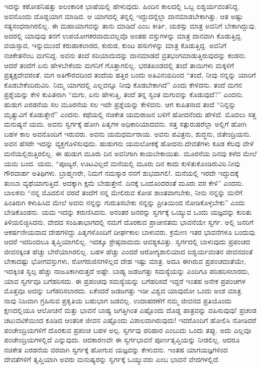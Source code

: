 ಇದನ್ನು ಕಠೋಪನಿಷತ್ತು ಅಲಂಕಾರಿಕ ಭಾಷೆಯಲ್ಲಿ ಹೇಳುವುದು. ಹಿಂದಿನ ಕಾಲದಲ್ಲಿ ಒಬ್ಬ ಐಶ್ವರ್ಯವಂತನಿದ್ದ. ಅವನೊಂದು ದೊಡ್ಡಯಾಗ ಮಾಡಿದ. ಆ ಯಾಗದಲ್ಲಿ ತನ್ನಲ್ಲಿ ಇದ್ದುದನ್ನೆಲ್ಲಾ ದಾನಮಾಡಬೇಕಾಗಿತ್ತು. ಆತ ಅಷ್ಟು ಸತ್ಯಸಂಧನಾಗಿರಲಿಲ್ಲ. ಈ ಮಹಾಯಾಗವನ್ನು ತಾನು ಮಾಡಿದೆ ಎಂಬ ಕೀರ್ತಿ, ಯಶಸ್ಸು ಮಾತ್ರ ಅವನಿಗೆ ಬೇಕಾಗಿದ್ದುವು. ಅದರಲ್ಲಿ ಯಾವುವು ತನಗೆ ಉಪಯೋಗಕರವಾದುವಲ್ಲವೊ ಅಂತಹ ವಸ್ತುಗಳನ್ನು ಮಾತ್ರ ದಾನವಾಗಿ ಕೊಡುತ್ತಿದ್ದ. ವಯಸ್ಸಾದ, ಇನ್ನುಮುಂದೆ ಕರುಹಾಕಲಾರದ, ಕುರುಡ, ಕುಂಟ ಹಸುಗಳನ್ನು ಮಾತ್ರ ಕೊಡುತ್ತಿದ್ದ. ಅವನಿಗೆ ನಚಿಕೇತನೆಂಬ ಮಗನಿದ್ದ. ಅವನು ತಂದೆ ಸರಿಯಾದುದನ್ನು ದಾನಮಾಡದೆ ವ್ರತಭಂಗಮಾಡುತ್ತಿರುವುದನ್ನು ಕಂಡನು. ಆದರೆ ತಂದೆಗೆ ಏನು ಹೇಳಬೇಕೆಂದು ಮಗನಿಗೆ ಗೊತ್ತಾಗಲಿಲ್ಲ. ಭರತಖಂಡದಲ್ಲಿ ತಂದೆ ತಾಯಿಗಳು ಮಕ್ಕಳಿಗೆ ಪ್ರತ್ಯಕ್ಷದೇವರಂತೆ. ಮಗ ಅತಿಗೌರವದಿಂದ ತಂದೆಯ ಹತ್ತಿರ ಬಂದು ಅತಿವಿನಯದಿಂದ “ತಂದೆ, ನೀವು ನನ್ನನ್ನು ಯಾರಿಗೆ ಕೊಡಬೇಕೆಂದಿರುವಿರಿ. ನಿಮ್ಮ ಯಾಗದಲ್ಲಿ ಎಲ್ಲವನ್ನೂ ನೀವು ಕೊಡಬೇಕಾಗಿದೆ” ಎಂದು ಕೇಳಿದನು. ತಂದೆ ಮಗನ ಪ್ರಶ್ನೆಯನ್ನು ಕೇಳಿ ಕುಪಿತನಾಗಿ “ಮಗು, ಏನು ಹೇಳುತ್ತಿ, ತಂದೆ ತನ್ನ ಸ್ವಂತ ಮಗುವನ್ನು ಕೊಡುವುದೆ?” ಎಂದನು. ಹುಡುಗ ಎರಡನೆಯ ಸಲ ಮೂರನೆಯ ಸಲ ಇದೇ ಪ್ರಶ್ನೆಯನ್ನು ಕೇಳಿದನು. ಆಗ ಕುಪಿತನಾದ ತಂದೆ “ನಿನ್ನನ್ನು ಮೃತ್ಯುವಿಗೆ ಕೊಡುತ್ತೇನೆ” ಎಂದನು. ಕಥೆಯಲ್ಲಿ ನಚಿಕೇತ ಯಮರಾಜನ ಬಳಿಗೆ ಹೋದನೆಂದು ಹೇಳಿದೆ. ಮೊದಲು ಸತ್ತ ಮನುಷ್ಯನೆ ಯಮ. ಅವನು ಸ್ವರ್ಗಕ್ಕೆ ಹೋಗಿ ಪಿತೃಗಳ ಅಧಿಕಾರಿಯಾದವನು. ಸತ್ತ ಸತ್ಪುರುಷರೆಲ್ಲಾ ಅಲ್ಲಿಗೆ ಹೋಗಿ ಬಹಳ ಕಾಲ ಅವನೊಂದಿಗೆ ಇರುವರು. ಅವನು ಯಮಧರ್ಮರಾಯ. ಅವನು ಪವಿತ್ರನು, ಶುದ್ಧನು, ಜಿತೇಂದ್ರಿಯನು. ಅವನ ಹೆಸರೇ ಇದನ್ನು ವ್ಯಕ್ತಗೊಳಿಸುವುದು. ಹುಡುಗನು ಯಮಲೋಕಕ್ಕೆ ಹೋದನು.ದೇವತೆಗಳು ಕೂಡ ಕೆಲವು ವೇಳೆ ಮನೆಯಲ್ಲಿರುತ್ತಿರಲಿಲ್ಲ. ಈ ಹುಡುಗ ಮೂರು ದಿನ ಅವನಿಗಾಗಿ ಕಾಯಬೇಕಾಯಿತು. ಮೂರನೆಯ ದಿನವು ಕಳೆದ ಮೇಲೆ ಯಮ ಬಂದ. ಯಮ, “ಪೂಜ್ಯರೆ, ಊಟವಿಲ್ಲದೆ ಮನೆಯಲ್ಲಿ ಮೂರು ದಿನ ಕಾದು ಕುಳಿತುಕೊಂಡಿರುವಿರಿ.ನೀವು ಗೌರವಾರ್ಹ ಅತಿಥಿಗಳು. ಬ್ರಾಹ್ಮಣರೇ, ನಿಮಗೆ ನಮಸ್ಕಾರ ನನಗೆ ಶುಭವಾಗಲಿ!. ಮನೆಯಲ್ಲಿ ಇರದೇ ಇದ್ದುದಕ್ಕೆ ತುಂಬಾ ವ್ಯಥೆಯಾಗುತ್ತಿದೆ. ಅದಕ್ಕಾಗಿ ಕ್ಷಮೆ ಬೇಡುತ್ತೇನೆ. ದಿನಕ್ಕೆ ಒಂದೊಂದರಂತೆ ಮೂರು ವರ ಕೇಳಿ” ಎಂದನು. ಬಾಲಕನು “ನನ್ನ ಮೊದಲಿನ ವರವೆ ತಂದೆಗೆ ನನ್ನ ಮೇಲಿರುವ ಕೋಪ ಶಾಂತವಾಗಬೇಕು, ನೀನು ನನ್ನನ್ನು ಮನೆಗೆ ಹಿಂತಿರುಗಿ ಕಳುಹಿಸಿದ ಮೇಲೆ ಅವನು ನನ್ನನ್ನು ಗುರುತಿಸಬೇಕು ನನ್ನನ್ನು ಪ್ರೀತಿಯಿಂದ ನೋಡಿಕೊಳ್ಳಬೇಕು” ಎಂದು ಬೇಡಿಕೊಂಡನು. ಯಮ ಇದನ್ನು ಕರುಣಿಸಿದನು. ಅನಂತರ ಜನರನ್ನು ಸ್ವರ್ಗಕ್ಕೆ ಒಯ್ಯುವ ಒಂದು ಯಜ್ಞವನ್ನು ಕುರಿತು ತಿಳಿಯಲಿಚ್ಛಿಸಿದನು. ವೇದದ ಸಂಹಿತಾಭಾಗದಲ್ಲಿ ನಮಗೆ ದೊರಕುವ ಪ್ರಾಚೀನತಮ ಭಾವನೆಯೇ ಸ್ವರ್ಗ. ಅಲ್ಲಿ ಜನರಿಗೆ ಆಕರ್ಷಣೀಯವಾದ ದೇಹಗಳಿದ್ದು ಪಿತೃಗಳೊಂದಿಗೆ ದೀರ್ಘಕಾಲ ಬಾಳುವರು. ಕ್ರಮೇಣ ಇತರ ಭಾವನೆಗಳೂ ಬಂದುವು. ಆದರೆ ಇದರಿಂದಲೂ ತೃಪ್ತಿಯಾಗಲಿಲ್ಲ. ಇದಕ್ಕೂ ಶ್ರೇಷ್ಠವಾದುದು ಆವಶ್ಯಕವಿತ್ತು. ಸ್ವರ್ಗದಲ್ಲಿ ಬಾಳುವುದು ಪ್ರಪಂಚದ ಜೀವನಕ್ಕಿಂತ ಹೆಚ್ಚು ಬೇರೆಯಾಗಿರಲಿಲ್ಲ. ಬಹಳ ಹೆಚ್ಚು ಎಂದರೆ ಆರೋಗ್ಯಶಾಲಿಯಾದ ಐಶ್ವರ್ಯವಂತನ ಜೀವನದಂತೆ ಬೇಕಾದಷ್ಟು ಭೋಗವಸ್ತುಗಳು, ರೋಗರುಜಿನಗಳಿಲ್ಲದ ದೇಹ ಇಷ್ಟು ಮಾತ್ರ. ಅದೂ ಈಗಿರುವ ಪ್ರಪಂಚದಂತೆಯೇ, ಇದಕ್ಕಿಂತ ಸ್ವಲ್ಪ ಹೆಚ್ಚು ನಾಜೂಕಾಗಿರುತ್ತದೆ ಅಷ್ಟೇ. ಬಾಹ್ಯ ಜಡಜಗತ್ತು ಸಮಸ್ಯೆಯನ್ನು ಎಂದಿಗೂ ಪರಿಹರಿಸಲಾರದು, ಯಾವ ಸ್ವರ್ಗವೂ ಬಗೆಹರಿಸದು. ಈ ಪ್ರಪಂಚವು ಸಮಸ್ಯೆಯನ್ನು ಬಗೆಹರಿಸದೆ ಇದ್ದರೆ ಇಂತಹ ಅನೇಕ ಪ್ರಪಂಚಗಳ ಮೊತ್ತವೂ ಅದನ್ನು ಬಗೆಹರಿಸಲಾರದು. ಏಕೆಂದರೆ ಜಡಜಗತ್ತು ಇಡೀ ವಿಶ್ವದ ಯಾವುದೋ ಒಂದು ಅಂಶ ಮಾತ್ರ. ನಾವು ನಿಜವಾಗಿ ಗ್ರಹಿಸುವ ಪ್ರಕೃತಿಯ ಬಹುಭಾಗ ಜಡವಲ್ಲ. ಉದಾಹರಣೆಗೆ ನಮ್ಮ ಜೀವನದ ಪ್ರತಿಯೊಂದು ಕ್ಷಣದಲ್ಲಿಯೂ ಆಲೋಚನೆ ಮತ್ತು ಭಾವನೆ ಬಾಹ್ಯ ಜಗತ್ತಿಗಿಂತ ಎಷ್ಟೊಂದು ದೊಡ್ಡ ಪಾತ್ರವನ್ನು ವಹಿಸುವುವು! ಪ್ರಚಂಡ ಚಟುವಟಿಕೆಯಿಂದ ಕೂಡಿದ ಆಂತರಿಕ ಜೀವನ ಎಷ್ಟೊಂದು ವಿಶಾಲವಾಗಿರುವುದು! ಇದರೊಂದಿಗೆ ಹೋಲಿಸಿ ನೋಡಿದರೆ ಪಂಚೇಂದ್ರಿಯಗಳಿಗೆ ದೊರಕುವ ಪ್ರಪಂಚ ಬಹಳ ಅಲ್ಪ. ಸ್ವರ್ಗವು ಪರಿಹಾರ ಎಂಬುದು ಒಂದು ತಪ್ಪು. ಅದು ಎಲ್ಲವೂ ಪಂಚೇಂದ್ರಿಯಗಳಲ್ಲಿದೆ ಎನ್ನುವುದು. ಆದಕಾರಣವೇ ಈ ಸ್ವರ್ಗಭಾವನೆ ಪೂರ್ಣತೃಪ್ತಿಯನ್ನು ನೀಡಲಿಲ್ಲ. ಆದರೂ ನಚಿಕೇತ ಎರಡನೆಯ ವರವಾಗಿ ಸ್ವರ್ಗಕ್ಕೆ ಹೋಗುವ ಯಜ್ಞವನ್ನು ಕೇಳುವನು. ಇಂತಹ ಯಾಗಯಜ್ಞಗಳಿಂದ ದೇವತೆಗಳಿಗೆ ತೃಪ್ತಿಯಾಗಿ ಅವರು ಮನುಷ್ಯರನ್ನು ಸ್ವರ್ಗಕ್ಕೆ ಒಯ್ಯುವರು ಎಂಬ ಭಾವನೆ ವೇದಗಳಲ್ಲಿದೆ.

